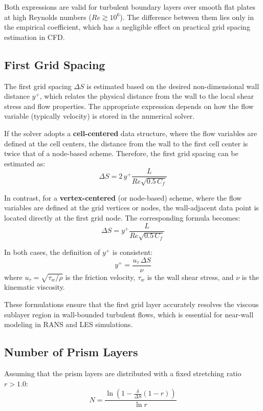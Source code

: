 \documentclass[12pt,a4paper]{article}
\begin{document}
Both expressions are valid for turbulent boundary layers over smooth flat plates at high Reynolds numbers ($Re \gtrsim 10^6$). The difference between them lies only in the empirical coefficient, which has a negligible effect on practical grid spacing estimation in CFD.


\subsection{First Grid Spacing}

The first grid spacing $\Delta S$ is estimated based on the desired non-dimensional wall distance $y^+$, which relates the physical distance from the wall to the local shear stress and flow properties. The appropriate expression depends on how the flow variable (typically velocity) is stored in the numerical solver.

If the solver adopts a \textbf{cell-centered} data structure, where the flow variables are defined at the cell centers, the distance from the wall to the first cell center is twice that of a node-based scheme. Therefore, the first grid spacing can be estimated as:
\begin{equation}
\Delta S = 2 \, y^+ \frac{L}{Re \sqrt{0.5 \, C_f}}
\end{equation}

In contrast, for a \textbf{vertex-centered} (or node-based) scheme, where the flow variables are defined at the grid vertices or nodes, the wall-adjacent data point is located directly at the first grid node. The corresponding formula becomes:
\begin{equation}
\Delta S = y^+ \frac{L}{Re \sqrt{0.5 \, C_f}}
\end{equation}

In both cases, the definition of $y^+$ is consistent:
\begin{equation}
y^+ = \frac{u_\tau \, \Delta S}{\nu}
\end{equation}
where $u_\tau = \sqrt{\tau_w / \rho}$ is the friction velocity, $\tau_w$ is the wall shear stress, and $\nu$ is the kinematic viscosity.

These formulations ensure that the first grid layer accurately resolves the viscous sublayer region in wall-bounded turbulent flows, which is essential for near-wall modeling in RANS and LES simulations.


\subsection{Number of Prism Layers}
Assuming that the prism layers are distributed with a fixed stretching ratio $r > 1.0$:
\begin{equation}
N = \frac{\ln(1 - \frac{\delta}{\Delta S}(1 - r))}{\ln r}
\end{equation}
\end{document}
